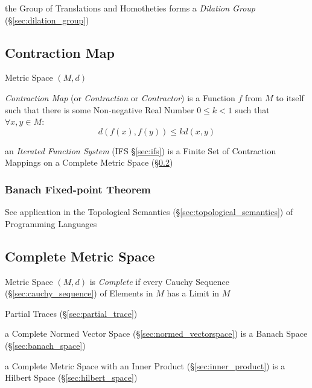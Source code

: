 the Group of Translations and Homotheties forms a \emph{Dilation Group}
(\S\ref{sec:dilation_group})



\subsection{Contraction Map}\label{sec:contraction_map}

Metric Space $(M,d)$

\emph{Contraction Map} (or \emph{Contraction} or \emph{Contractor}) is a
Function $f$ from $M$ to itself such that there is some Non-negative Real Number
$0 \leq k < 1$ such that $\forall x,y \in M$:
\[
  d(f(x),f(y)) \leq k d(x,y)
\]

\fist an \emph{Iterated Function System} (IFS \S\ref{sec:ifs}) is a Finite Set
of Contraction Mappings on a Complete Metric Space
(\S\ref{sec:complete_metric_space})



\subsubsection{Banach Fixed-point Theorem}\label{sec:banach_fixedpoint}

\fist See application in the Topological Semantics
(\S\ref{sec:topological_semantics}) of Programming Languages



\subsection{Complete Metric Space}\label{sec:complete_metric_space}

Metric Space $(M,d)$ is \emph{Complete} if every Cauchy Sequence
(\S\ref{sec:cauchy_sequence}) of Elements in $M$ has a Limit in $M$

Partial Traces (\S\ref{sec:partial_trace})

a Complete Normed Vector Space (\S\ref{sec:normed_vectorspace}) is a Banach
Space (\S\ref{sec:banach_space})

a Complete Metric Space with an Inner Product (\S\ref{sec:inner_product}) is a
Hilbert Space (\S\ref{sec:hilbert_space})

